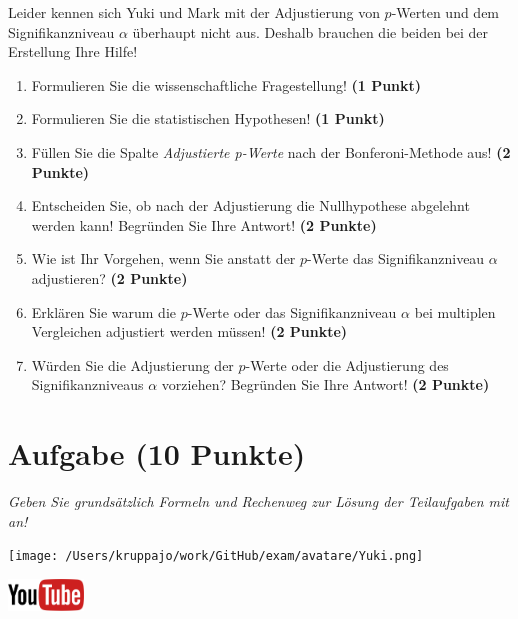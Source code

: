 \documentclass[a4paper, 9pt]{scrartcl}\usepackage[]{graphicx}\usepackage[]{xcolor}
\begin{document}
Leider kennen sich Yuki und Mark mit der Adjustierung von $p$-Werten und dem Signifikanzniveau $\alpha$ überhaupt nicht aus. Deshalb brauchen die beiden bei der Erstellung Ihre Hilfe!

\begin{enumerate}
  \item Formulieren Sie die wissenschaftliche Fragestellung! \textbf{(1 Punkt)}
  \item Formulieren Sie die statistischen Hypothesen! \textbf{(1 Punkt)}
\item Füllen Sie die Spalte \textit{Adjustierte p-Werte} nach der Bonferoni-Methode aus! \textbf{(2 Punkte)}
\item Entscheiden Sie, ob nach der Adjustierung die Nullhypothese abgelehnt werden kann! Begründen Sie Ihre Antwort! \textbf{(2 Punkte)}
\item Wie ist Ihr Vorgehen, wenn Sie anstatt der $p$-Werte das Signifikanzniveau $\alpha$ adjustieren? \textbf{(2 Punkte)}
\item Erklären Sie warum die $p$-Werte oder das Signifikanzniveau $\alpha$ bei multiplen Vergleichen adjustiert werden müssen! \textbf{(2 Punkte)}
\item Würden Sie die Adjustierung der $p$-Werte oder die Adjustierung des Signifikanzniveaus $\alpha$ vorziehen? Begründen Sie Ihre Antwort! \textbf{(2 Punkte)}
\end{enumerate}


 
\clearpage

\section{Aufgabe \hfill (10 Punkte)}

\textit{Geben Sie grundsätzlich Formeln und Rechenweg zur Lösung der Teilaufgaben mit an!} \\[1Ex]
 

 
\begin{minipage}[t]{0.5\textwidth}
\texttt{[image: /Users/kruppajo/work/GitHub/exam/avatare/Yuki.png]}
\end{minipage}
\begin{minipage}[t]{0.5\textwidth}
\hfill
\href{https://youtu.be/xq29O8qDrg0}{\includegraphics[width = 2cm]{img/youtube}}
\end{minipage}
\vspace{1ex}
\end{document}
